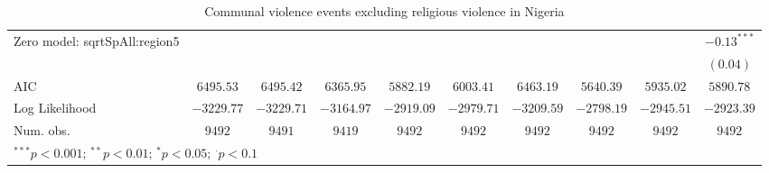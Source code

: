 \begin{table}
\begin{center}
{\begin{tabular}{l c c c c c c c c c}
Zero model: sqrtSpAll:region5  &                &                &                &                 &                &                 &                 &                 & $-0.13^{***}$  \\
                               &                &                &                &                 &                &                 &                 &                 & $(0.04)$       \\
\midrule
AIC                            & $6495.53$      & $6495.42$      & $6365.95$      & $5882.19$       & $6003.41$      & $6463.19$       & $5640.39$       & $5935.02$       & $5890.78$      \\
Log Likelihood                 & $-3229.77$     & $-3229.71$     & $-3164.97$     & $-2919.09$      & $-2979.71$     & $-3209.59$      & $-2798.19$      & $-2945.51$      & $-2923.39$     \\
Num. obs.                      & $9492$         & $9491$         & $9419$         & $9492$          & $9492$         & $9492$          & $9492$          & $9492$          & $9492$         \\
\bottomrule
\multicolumn{10}{l}{\scriptsize{$^{***}p<0.001$; $^{**}p<0.01$; $^{*}p<0.05$; $^{\cdot}p<0.1$}}
\end{tabular}
}
\caption{Communal violence events excluding religious violence
	       in Nigeria}
\label{zorg3nigreldif}
\end{center}
\end{table}

